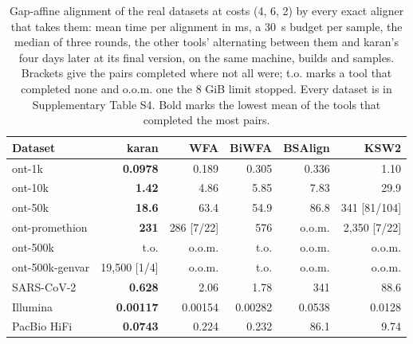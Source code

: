 \begin{table}[t]
\caption{Gap-affine alignment of the real datasets at costs (4, 6, 2) by every exact aligner that takes them: mean time per alignment in ms, a 30~s budget per sample, the median of three rounds, the other tools' alternating between them and karan's four days later at its final version, on the same machine, builds and samples. Brackets give the pairs completed where not all were; t.o. marks a tool that completed none and o.o.m. one the 8 GiB limit stopped. Every dataset is in Supplementary Table S4. Bold marks the lowest mean of the tools that completed the most pairs.}\label{tab:affine}
\centering\footnotesize
\setlength{\tabcolsep}{4pt}
\begin{tabular}{@{}lrrrrr@{}}
\toprule
Dataset & karan & WFA & BiWFA & BSAlign & KSW2 \\
\midrule
ont-1k & \textbf{0.0978} & 0.189 & 0.305 & 0.336 & 1.10 \\
ont-10k & \textbf{1.42} & 4.86 & 5.85 & 7.83 & 29.9 \\
ont-50k & \textbf{18.6} & 63.4 & 54.9 & 86.8 & 341 [81/104] \\
ont-promethion & \textbf{231} & 286 [7/22] & 576 & o.o.m. & 2{,}350 [7/22] \\
ont-500k & t.o. & o.o.m. & t.o. & o.o.m. & o.o.m. \\
ont-500k-genvar & 19{,}500 [1/4] & o.o.m. & t.o. & o.o.m. & o.o.m. \\
SARS-CoV-2 & \textbf{0.628} & 2.06 & 1.78 & 341 & 88.6 \\
Illumina & \textbf{0.00117} & 0.00154 & 0.00282 & 0.0538 & 0.0128 \\
PacBio HiFi & \textbf{0.0743} & 0.224 & 0.232 & 86.1 & 9.74 \\
\bottomrule
\end{tabular}
\end{table}
